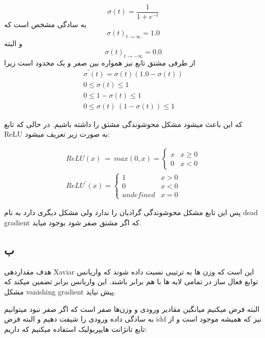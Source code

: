 \documentclass{article}[12pt]
\begin{document}
\begin{equation*}
	\sigma(t)=\frac{1}{1+e^{-t}}
\end{equation*}
به سادگی مشخص است که 
\begin{equation*}
	\sigma(t)_{t \rightarrow \infty}=1.0
\end{equation*}
و البته 
\begin{equation*}
	\sigma(t)_{t \rightarrow-\infty}=0.0
\end{equation*}
از طرفی مشتق تابع نیز همواره بین صفر و یک محدود است زیرا
\begin{gather*}
	\sigma^{\prime}(t)=\sigma(t)(1.0-\sigma(t))\\
		0\leqslant \sigma ( t) \leqslant 1\\
		0\leqslant 1-\sigma ( t) \leqslant 1\\
		0\leqslant \sigma ( t) \ ( 1-\sigma ( t)) \leqslant 1
\end{gather*}

که این باعث میشود مشکل محوشوندگی مشتق را داشته باشیم. در حالی که تابع ReLU به صورت زیر تعریف میشود:

\begin{gather*}
		ReLU( x) \ =\ max( 0,x) =\begin{cases}
			x & x\geqslant 0\\
			0 & x< 0
		\end{cases}\\
		ReLU^\prime ( x) =\begin{cases}
			1 & x >0\\
			0 & x< 0\\
			undefined & x=0
		\end{cases}
\end{gather*}

پس این تابع مشکل محوشوندگی گرادیان را ندارد ولی مشکل دیگری دارد به نام dead gradient که اگر مشتق صفر شود بوجود میاید. 


\subsection{ب}
هدف مقداردهی Xaviar این است که وزن ها به ترتیبی نسبت داده شوند که واریانس توابع فعال ساز در تمامی لایه ها با هم برابر باشند. این واریانس برابر تضمین میکند که مشکل vanishing gradient پیش نیاید. 

البته فرض میکنیم میانگین مقادیر ورودی و وزن‌ها صفر است که اگر صفر نبود میتوانیم به سادگی داده ورودی را شیفت دهیم و البته فرض idd نیز که همیشه موجود است و از تابع تانژانت هایپربولیک استفاده میکنیم که داریم:
\end{document}
